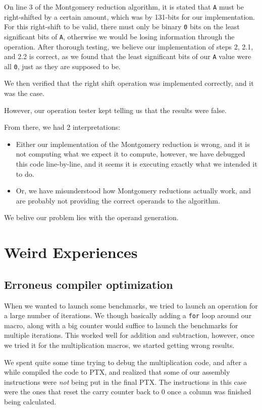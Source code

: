\documentclass[12pt, a4paper]{report}
\begin{document}
\begin{sloppypar}
On line 3 of the Montgomery reduction algorithm, it is stated that \verb+A+ must be
right-shifted by a certain amount, which was by 131-bits for our implementation.
For this right-shift to be valid, there must only be binary \verb+0+ bits on the least
significant bits of \verb+A+, otherwise we would be losing information through
the operation.
After thorough testing, we believe our implementation of steps
2, 2.1, and 2.2 is correct, as we found that the least significant bits of our
\verb+A+ value were all \verb+0+, just as they are supposed to be.

We then verified that the right shift operation was implemented correctly, and it was the case.

However, our operation tester kept telling us that the results were false.

From there, we had 2 interpretations:
\begin{itemize}
\item Either our implementation of the Montgomery reduction is wrong, and it is not computing
what we expect it to compute, however, we have debugged this code line-by-line,
and it seems it is executing exactly what we intended it to do.

\item Or, we have misunderstood how Montgomery reductions
actually work, and are probably not providing the correct operands to the algorithm.
\end{itemize}

We belive our problem lies with the operand generation.

\section{Weird Experiences}
\subsection{Erroneus compiler optimization}
When we wanted to launch some benchmarks, we tried to launch an operation for a
large number of iterations.
We though basically adding a \verb+for+ loop around our macro, along with a big
counter would suffice to launch the benchmarks for multiple iterations.
This worked well for addition and subtraction, however, once we tried it for
the multiplication macros, we started getting wrong results.

We spent quite some time trying to debug the multiplication code, and after a while
compiled the code to PTX, and realized that some of our assembly instructions were
\emph{not} being put in the final PTX.
The instructions in this case were the ones that reset the carry counter back to 0
once a column was finished being calculated.


\end{sloppypar}
\end{document}
